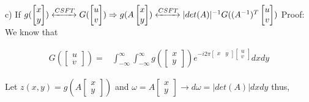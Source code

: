 \documentclass[11pt]{article}
\begin{document}
\begin{flushleft}
c) \newline
If $g(\begin{bmatrix}
    x \\ y
\end{bmatrix}) \xleftrightarrow{CSFT} 
G(\begin{bmatrix}
    u \\ v
\end{bmatrix}) \Rightarrow g(A\begin{bmatrix}
    x \\ y
\end{bmatrix}) \xleftrightarrow{CSFT} 
|det(A)|^{-1}G((A^{-1})^T\begin{bmatrix}
    u \\ v
\end{bmatrix})$
\newline\newline\newline
Proof:
\newline
We know that
\end{flushleft} 
\begin{equation*}
\begin{split}
G(\begin{bmatrix}
    u \\ v
\end{bmatrix}) =  & \int_{-\infty}^{\infty} \int_{-\infty}^{\infty} 
g(\begin{bmatrix}
    x \\ y
\end{bmatrix})
e^{-i2\pi 
    \begin{bmatrix}
        x & y
    \end{bmatrix}    
    \begin{bmatrix}
        u \\ v
    \end{bmatrix}
}
dxdy
\end{split}
\end{equation*}
\begin{flushleft}
Let $z(x, y) =
g(A\begin{bmatrix}
    x \\ y
\end{bmatrix})$ and 
    $\omega = A\begin{bmatrix}
        x \\ y
    \end{bmatrix} \rightarrow d\omega = |det(A)|dx dy$
thus,
\end{flushleft} 
\end{document}

